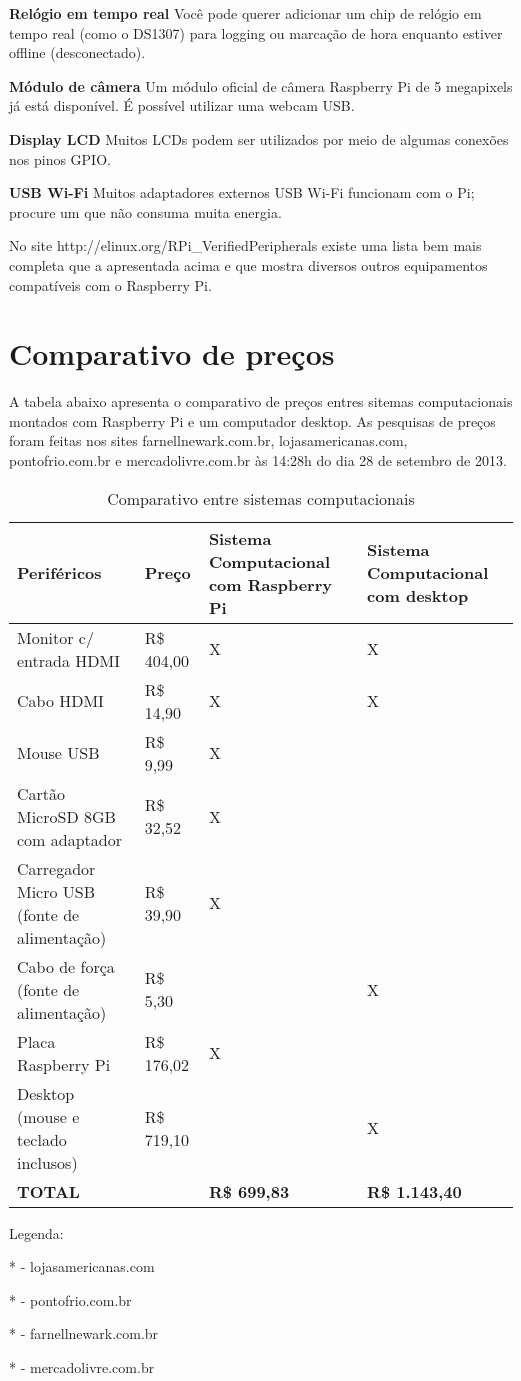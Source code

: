 \textbf{Relógio em tempo real} Você pode querer adicionar um chip de relógio em tempo real (como o DS1307) para logging ou marcação de hora enquanto estiver offline (desconectado).

\textbf{Módulo de câmera} Um módulo oficial de câmera Raspberry Pi de 5 megapixels já está disponível. É possível utilizar uma webcam USB.

\textbf{Display LCD} Muitos LCDs podem ser utilizados por meio de algumas conexões nos pinos GPIO.

\textbf{USB Wi-Fi} Muitos adaptadores externos USB Wi-Fi funcionam com o Pi; procure um que não consuma muita energia. 

No site http://elinux.org/RPi\_VerifiedPeripherals existe uma lista bem mais completa que a apresentada acima e que mostra diversos outros equipamentos compatíveis com o Raspberry Pi.

\newpage

\section{Comparativo de preços}

A tabela abaixo apresenta o comparativo de preços entres sitemas computacionais montados com Raspberry Pi e um computador desktop. As pesquisas de preços foram feitas nos sites farnellnewark.com.br, lojasamericanas.com, pontofrio.com.br e mercadolivre.com.br às 14:28h do dia 28 de setembro de 2013.

\begin{table}[!htpb]
 \centering
    \begin{tabular}{|p{4cm}|p{2cm}|p{4cm}|p{4cm}|} 
    \hline
        \textbf{Periféricos} & \textbf{Preço} & \textbf{Sistema Computacional com Raspberry Pi} & \textbf{Sistema Computacional com desktop} \\
    \hline
        Monitor c/ entrada HDMI & R\$ 404,00 & X & X \\
    \hline
        Cabo HDMI & R\$ 14,90 & X & X \\
    \hline
        Mouse USB & R\$ 9,99 & X & \\
    \hline
        Cartão MicroSD 8GB com adaptador & R\$ 32,52 & X & \\
    \hline
        Carregador Micro USB (fonte de alimentação) & R\$ 39,90 & X & \\
    \hline
        Cabo de força (fonte de alimentação) & R\$ 5,30 & & X \\
    \hline
        Placa Raspberry Pi & R\$ 176,02 & X & \\
    \hline
        Desktop (mouse e teclado inclusos) & R\$ 719,10 & & X \\
    \hline
        \textbf{TOTAL} & & \textbf{R\$ 699,83} & \textbf{R\$ 1.143,40} \\
    \hline
    \end{tabular}
    \caption{Comparativo entre sistemas computacionais}
    \label{t_fixa}
\end{table}


Legenda:

* - lojasamericanas.com 

* - pontofrio.com.br 

* - farnellnewark.com.br

* - mercadolivre.com.br